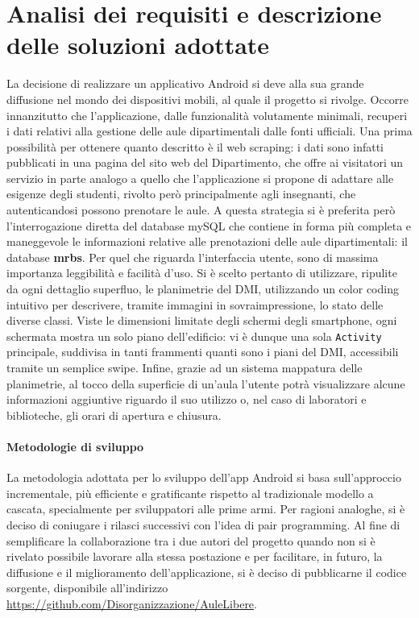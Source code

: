 \documentclass{article}
\def\code#1{\texttt{#1}}
\begin{document}
	\section{Analisi dei requisiti e descrizione delle soluzioni adottate} 
	La decisione di realizzare un applicativo Android si deve alla sua grande diffusione nel mondo dei dispositivi mobili, al quale il progetto si rivolge.
	Occorre innanzitutto che l'applicazione, dalle funzionalità volutamente minimali, recuperi i dati relativi alla gestione delle aule dipartimentali dalle fonti ufficiali. Una prima possibilità per ottenere quanto descritto è il web scraping: i dati sono infatti pubblicati in una pagina del sito web del Dipartimento, che offre ai visitatori un servizio in parte analogo a quello che l'applicazione si propone di adattare alle esigenze degli studenti, rivolto però principalmente agli insegnanti, che autenticandosi possono prenotare le aule. A questa strategia si è preferita però l'interrogazione diretta del database mySQL che contiene in forma più completa e maneggevole le informazioni relative alle prenotazioni delle aule dipartimentali: il database \textbf{mrbs}. %
	Per quel che riguarda l'interfaccia utente, sono di massima importanza leggibilità e facilità d'uso. Si è scelto pertanto di utilizzare, ripulite da ogni dettaglio superfluo, le planimetrie del DMI, utilizzando un color coding intuitivo per descrivere, tramite immagini in sovraimpressione, lo stato delle diverse classi. Viste le dimensioni limitate degli schermi degli smartphone, ogni schermata mostra un solo piano dell'edificio: vi è dunque una sola \code{Activity} principale, suddivisa in tanti frammenti quanti sono i piani del DMI, accessibili tramite un semplice swipe. Infine, grazie ad un sistema mappatura delle planimetrie, al tocco della superficie di un'aula l'utente potrà visualizzare alcune informazioni aggiuntive riguardo il suo utilizzo o, nel caso di laboratori e biblioteche, gli orari di apertura e chiusura.
	\paragraph{Metodologie di sviluppo}
	La metodologia adottata per lo sviluppo dell'app Android si basa sull'approccio incrementale, più efficiente e gratificante rispetto al tradizionale modello a cascata, specialmente per sviluppatori alle prime armi. Per ragioni analoghe, si è deciso di coniugare i rilasci successivi con l'idea di pair programming.
	Al fine di semplificare la collaborazione tra i due autori del progetto quando non si è rivelato possibile lavorare alla stessa postazione e per facilitare, in futuro, la diffusione e il miglioramento dell'applicazione, si è deciso di pubblicarne il codice sorgente, disponibile all'indirizzo \url{https://github.com/Disorganizzazione/AuleLibere}.
\end{document}
